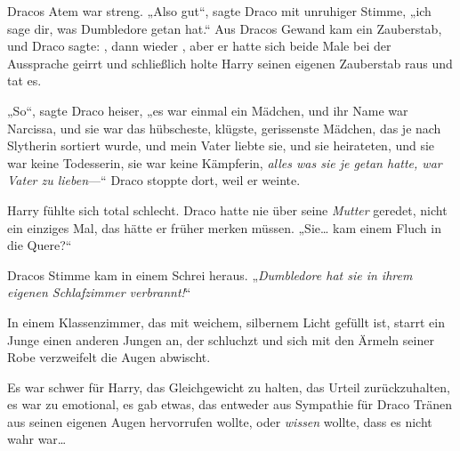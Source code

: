 Dracos Atem war streng. „Also gut“, sagte Draco mit unruhiger Stimme, „ich sage dir, was Dumbledore getan hat.“ Aus Dracos Gewand kam ein Zauberstab, und Draco sagte: , dann wieder , aber er hatte sich beide Male bei der Aussprache geirrt und schließlich holte Harry seinen eigenen Zauberstab raus und tat es.

„So“, sagte Draco heiser, „es war einmal ein Mädchen, und ihr Name war Narcissa, und sie war das hübscheste, klügste, gerissenste Mädchen, das je nach Slytherin sortiert wurde, und mein Vater liebte sie, und sie heirateten, und sie war keine Todesserin, sie war keine Kämpferin, \emph{alles was sie je getan hatte, war Vater zu lieben}—“ Draco stoppte dort, weil er weinte.

Harry fühlte sich total schlecht. Draco hatte nie über seine \emph{Mutter} geredet, nicht ein einziges Mal, das hätte er früher merken müssen. „Sie… kam einem Fluch in die Quere?“

Dracos Stimme kam in einem Schrei heraus. „\emph{Dumbledore hat sie in ihrem eigenen Schlafzimmer verbrannt!}“

\later

In einem Klassenzimmer, das mit weichem, silbernem Licht gefüllt ist, starrt ein Junge einen anderen Jungen an, der schluchzt und sich mit den Ärmeln seiner Robe verzweifelt die Augen abwischt.

Es war schwer für Harry, das Gleichgewicht zu halten, das Urteil zurückzuhalten, es war zu emotional, es gab etwas, das entweder aus Sympathie für Draco Tränen aus seinen eigenen Augen hervorrufen wollte, oder \emph{wissen} wollte, dass es nicht wahr war…

